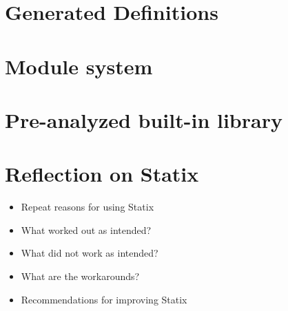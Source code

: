   \section{\label{sec:generated-definitions}Generated Definitions}

  \section{\label{sec:module-system}Module system}

  \section{\label{sec:built-in-library}Pre-analyzed built-in library}

  \section{\label{sec:statix-reflection}Reflection on Statix}

    \begin{itemize}
      \item Repeat reasons for using Statix
      \item What worked out as intended?
      \item What did not work as intended?
      \item What are the workarounds?
      \item Recommendations for improving Statix
    \end{itemize}

